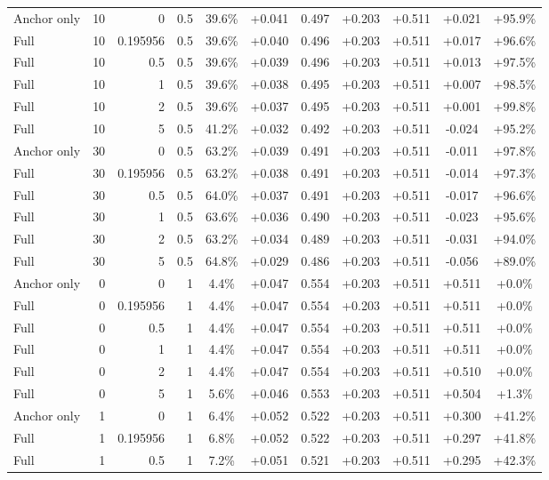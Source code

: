 \begin{table}[htbp]
\begin{tabular}{lrrrccccccc}
Anchor only & 10 & 0 & 0.5 & 39.6\% & +0.041 & 0.497 & +0.203 & +0.511 & +0.021 & +95.9\% \\
Full & 10 & 0.195956 & 0.5 & 39.6\% & +0.040 & 0.496 & +0.203 & +0.511 & +0.017 & +96.6\% \\
Full & 10 & 0.5 & 0.5 & 39.6\% & +0.039 & 0.496 & +0.203 & +0.511 & +0.013 & +97.5\% \\
Full & 10 & 1 & 0.5 & 39.6\% & +0.038 & 0.495 & +0.203 & +0.511 & +0.007 & +98.5\% \\
Full & 10 & 2 & 0.5 & 39.6\% & +0.037 & 0.495 & +0.203 & +0.511 & +0.001 & +99.8\% \\
Full & 10 & 5 & 0.5 & 41.2\% & +0.032 & 0.492 & +0.203 & +0.511 & -0.024 & +95.2\% \\
Anchor only & 30 & 0 & 0.5 & 63.2\% & +0.039 & 0.491 & +0.203 & +0.511 & -0.011 & +97.8\% \\
Full & 30 & 0.195956 & 0.5 & 63.2\% & +0.038 & 0.491 & +0.203 & +0.511 & -0.014 & +97.3\% \\
Full & 30 & 0.5 & 0.5 & 64.0\% & +0.037 & 0.491 & +0.203 & +0.511 & -0.017 & +96.6\% \\
Full & 30 & 1 & 0.5 & 63.6\% & +0.036 & 0.490 & +0.203 & +0.511 & -0.023 & +95.6\% \\
Full & 30 & 2 & 0.5 & 63.2\% & +0.034 & 0.489 & +0.203 & +0.511 & -0.031 & +94.0\% \\
Full & 30 & 5 & 0.5 & 64.8\% & +0.029 & 0.486 & +0.203 & +0.511 & -0.056 & +89.0\% \\
Anchor only & 0 & 0 & 1 & 4.4\% & +0.047 & 0.554 & +0.203 & +0.511 & +0.511 & +0.0\% \\
Full & 0 & 0.195956 & 1 & 4.4\% & +0.047 & 0.554 & +0.203 & +0.511 & +0.511 & +0.0\% \\
Full & 0 & 0.5 & 1 & 4.4\% & +0.047 & 0.554 & +0.203 & +0.511 & +0.511 & +0.0\% \\
Full & 0 & 1 & 1 & 4.4\% & +0.047 & 0.554 & +0.203 & +0.511 & +0.511 & +0.0\% \\
Full & 0 & 2 & 1 & 4.4\% & +0.047 & 0.554 & +0.203 & +0.511 & +0.510 & +0.0\% \\
Full & 0 & 5 & 1 & 5.6\% & +0.046 & 0.553 & +0.203 & +0.511 & +0.504 & +1.3\% \\
Anchor only & 1 & 0 & 1 & 6.4\% & +0.052 & 0.522 & +0.203 & +0.511 & +0.300 & +41.2\% \\
Full & 1 & 0.195956 & 1 & 6.8\% & +0.052 & 0.522 & +0.203 & +0.511 & +0.297 & +41.8\% \\
Full & 1 & 0.5 & 1 & 7.2\% & +0.051 & 0.521 & +0.203 & +0.511 & +0.295 & +42.3\% \\

\end{tabular}
\end{table}
